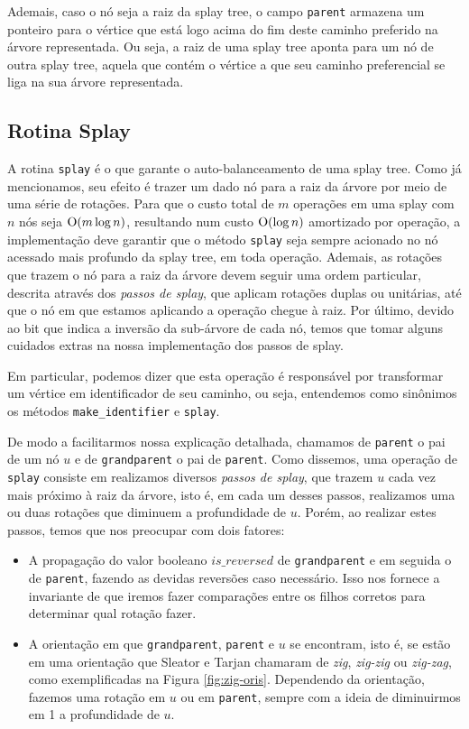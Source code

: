 Ademais, caso o nó seja a raiz da splay tree, o campo \texttt{parent} armazena um ponteiro para o vértice que está logo acima do fim deste caminho preferido na árvore representada. Ou seja, a raiz de uma splay tree aponta para um nó de outra splay tree, aquela que contém o vértice a que seu caminho preferencial se liga na sua árvore representada.

\subsection{Rotina Splay}
\label{subsection:lct-splay-splay}

A rotina \texttt{splay} é o que garante o auto-balanceamento de uma splay tree. Como já mencionamos, seu efeito é trazer um dado nó para a raiz da árvore por meio de uma série de rotações. Para que o custo total de $m$ operações em uma splay com $n$ nós seja $\mathrm{O} (m \log n) $, resultando num custo $\mathrm{O}(\log n)$ amortizado por operação, a implementação deve garantir que o método \texttt{splay} seja sempre acionado no nó acessado mais profundo da splay tree, em toda operação. Ademais, as rotações que trazem o nó para a raiz da árvore devem seguir uma ordem particular, descrita através dos \emph{passos de splay}, que aplicam rotações duplas ou unitárias, até que o nó em que estamos aplicando a operação chegue à raiz. Por último, devido ao bit que indica a inversão da sub-árvore de cada nó, temos que tomar alguns cuidados extras na nossa implementação dos passos de splay.

Em particular, podemos dizer que esta operação é responsável por transformar um vértice em identificador de seu caminho, ou seja, entendemos como sinônimos os métodos \texttt{make\_identifier} e \texttt{splay}.

De modo a facilitarmos nossa explicação detalhada, chamamos de \texttt{parent} o pai de um nó $u$ e de \texttt{grandparent} o pai de \texttt{parent}. Como dissemos, uma operação de \texttt{splay} consiste em realizamos diversos \emph{passos de splay}, que trazem $u$ cada vez mais próximo à raiz da árvore, isto é, em cada um desses passos, realizamos uma ou duas rotações que diminuem a profundidade de $u$. Porém, ao realizar estes passos, temos que nos preocupar com dois fatores:

\begin{itemize}
    \item A propagação do valor booleano $is\_reversed$ de \texttt{grandparent} e em seguida o de \texttt{parent}, fazendo as devidas reversões caso necessário. Isso nos fornece a invariante de que iremos fazer comparações entre os filhos corretos para determinar qual rotação fazer.
    \item A orientação em que \texttt{grandparent}, \texttt{parent} e $u$ se encontram, isto é, se estão em uma orientação que Sleator e Tarjan chamaram de \textit{zig}, \textit{zig-zig} ou \textit{zig-zag}, como exemplificadas na Figura \ref{fig:zig-oris}. Dependendo da orientação, fazemos uma rotação em $u$ ou em \texttt{parent}, sempre com a ideia de diminuirmos em 1 a profundidade de $u$.
\end{itemize}

